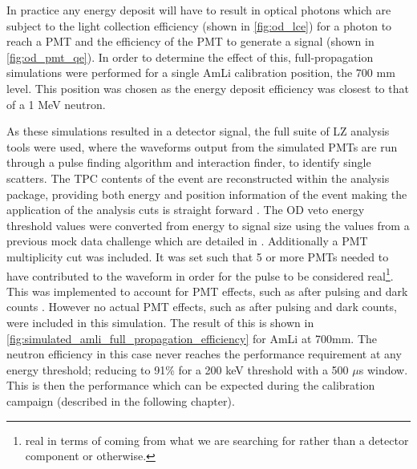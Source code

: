 



\par
In practice any energy deposit will have to result in optical photons which are subject to the light collection efficiency (shown in \autoref{fig:od_lce}) for a photon to reach a PMT and the efficiency of the PMT to generate a signal (shown in \autoref{fig:od_pmt_qe}).
In order to determine the effect of this, full-propagation simulations were performed for a single AmLi calibration position, the 700 mm level.
This position was chosen as the energy deposit efficiency was closest to that of a 1 MeV neutron.

\par
As these simulations resulted in a detector signal, the full suite of LZ analysis tools were used, where the waveforms output from the simulated PMTs are run through a pulse finding algorithm and interaction finder, to identify single scatters.
The TPC contents of the event are reconstructed within the analysis package, providing both energy and position information of the event making the application of the analysis cuts is straight forward \cite{lz_simulations_ref}.
The OD veto energy threshold values were converted from energy to signal size using the values from a previous mock data challenge which are detailed in \cite{jonathannikoleyczik_thesis_ref}.
Additionally a PMT multiplicity cut was included.
It was set such that 5 or more PMTs needed to have contributed to the waveform in order for the pulse to be considered real\footnote{real in terms of coming from what we are searching for rather than a detector component or otherwise.}.
This was implemented to account for PMT effects, such as after pulsing and dark counts \cite{jonathannikoleyczik_thesis_ref}.
However no actual PMT effects, such as after pulsing and dark counts, were included in this simulation.
The result of this is shown in \autoref{fig:simulated_amli_full_propagation_efficiency} for AmLi at 700mm. 
The neutron efficiency in this case never reaches the performance requirement at any energy threshold; reducing to 91\% for a 200 keV threshold with a 500 $\mu$s window.
This is then the performance which can be expected during the calibration campaign (described in the following chapter).




